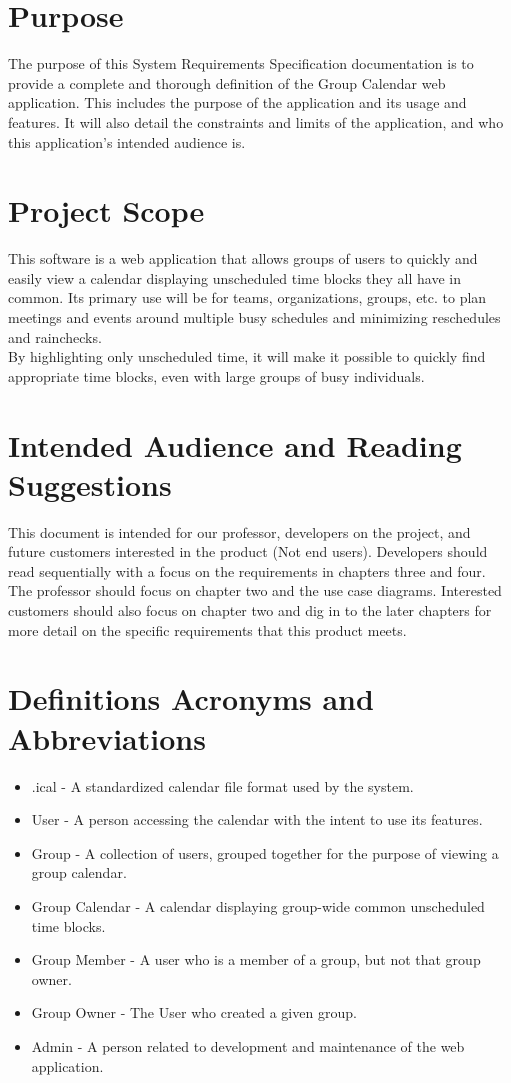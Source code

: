 \documentclass{scrreprt}
\begin{document}
\section{Purpose}

The purpose of this System Requirements Specification documentation is to
provide a complete and thorough definition of the Group Calendar web application.
This includes the purpose of the application and its usage and features. It will
also detail the constraints and limits of the application, and who this
application's intended audience is.


\section{Project Scope}

This software is a web application that allows groups of users to quickly and easily 
view a calendar displaying unscheduled time blocks they all have in common. Its 
primary use will be for teams, organizations, groups, etc. to plan meetings and
events around multiple busy schedules and minimizing reschedules and rainchecks.
\\By highlighting only unscheduled time, it will make it possible to quickly find
appropriate time blocks, even with large groups of busy individuals.


\section{Intended Audience and Reading Suggestions}

This document is intended for our professor, developers on the project, and
future customers interested in the product (Not end users). Developers should
read sequentially with a focus on the requirements in chapters three and four.
The professor should focus on chapter two and the use case diagrams. Interested
customers should also focus on chapter two and dig in to the later chapters for
more detail on the specific requirements that this product meets.


\section{Definitions Acronyms and Abbreviations}
\begin{itemize}
\item .ical - A standardized calendar file format used by the system.
\item User - A person accessing the calendar with the intent to use its 
features.
\item Group - A collection of users, grouped together for the purpose of viewing
a group calendar.
\item Group Calendar - A calendar displaying group-wide common unscheduled time blocks.
\item Group Member - A user who is a member of a group, but not that group owner.
\item Group Owner - The User who created a given group.
\item Admin - A person related to development and maintenance of the web application.
\end{itemize}
\end{document}
